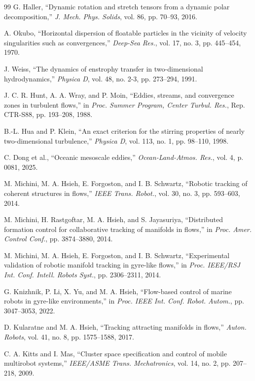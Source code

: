 \documentclass[lettersize,journal]{IEEEtran}
\begin{document}
\begin{thebibliography}{99}
 G. Haller, ``Dynamic rotation and stretch tensors from a
dynamic polar decomposition,'' \textit{J. Mech. Phys. Solids}, vol. 86,
pp. 70--93, 2016.

 A. Okubo, ``Horizontal dispersion of floatable particles in the
vicinity of velocity singularities such as convergences,'' \textit{Deep-Sea
Res.}, vol. 17, no. 3, pp. 445--454, 1970.

 J. Weiss, ``The dynamics of enstrophy transfer in two-dimensional
hydrodynamics,'' \textit{Physica D}, vol. 48, no. 2-3, pp. 273--294, 1991.

 J. C. R. Hunt, A. A. Wray, and P. Moin, ``Eddies, streams, and
convergence zones in turbulent flows,'' in \textit{Proc. Summer Program,
Center Turbul. Res.}, Rep. CTR-S88, pp. 193--208, 1988.

 B.-L. Hua and P. Klein, ``An exact criterion for the stirring
properties of nearly two-dimensional turbulence,'' \textit{Physica D}, vol. 113,
no. 1, pp. 98--110, 1998.

 C. Dong et al., ``Oceanic mesoscale eddies,''
\textit{Ocean-Land-Atmos. Res.}, vol. 4, p. 0081, 2025.

 M. Michini, M. A. Hsieh, E. Forgoston, and I. B. Schwartz,
``Robotic tracking of coherent structures in flows,'' \textit{IEEE Trans.
Robot.}, vol. 30, no. 3, pp. 593--603, 2014.

 M. Michini, H. Rastgoftar, M. A. Hsieh, and S. Jayasuriya,
``Distributed formation control for collaborative tracking of manifolds in
flows,'' in \textit{Proc. Amer. Control Conf.}, pp. 3874--3880, 2014.

 M. Michini, M. A. Hsieh, E. Forgoston, and I. B. Schwartz,
``Experimental validation of robotic manifold tracking in gyre-like flows,''
in \textit{Proc. IEEE/RSJ Int. Conf. Intell. Robots Syst.},
pp. 2306--2311, 2014.

 G. Knizhnik, P. Li, X. Yu, and M. A. Hsieh, ``Flow-based control
of marine robots in gyre-like environments,'' in \textit{Proc. IEEE Int. Conf.
Robot. Autom.}, pp. 3047--3053, 2022.

 D. Kularatne and M. A. Hsieh, ``Tracking attracting manifolds in
flows,'' \textit{Auton. Robots}, vol. 41, no. 8, pp. 1575--1588, 2017.

 C. A. Kitts and I. Mas, ``Cluster space specification and control
of mobile multirobot systems,'' \textit{IEEE/ASME Trans. Mechatronics},
vol. 14, no. 2, pp. 207--218, 2009.


\end{thebibliography}
\end{document}
